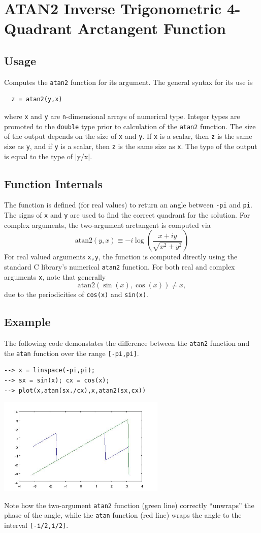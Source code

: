 \section{ATAN2 Inverse Trigonometric 4-Quadrant Arctangent Function}

\subsection{Usage}

Computes the \verb|atan2| function for its argument.  The general
syntax for its use is
\begin{verbatim}
  z = atan2(y,x)
\end{verbatim}
where \verb|x| and \verb|y| are \verb|n|-dimensional arrays of numerical type.
Integer types are promoted to the \verb|double| type prior to
calculation of the \verb|atan2| function. The size of the output depends
on the size of \verb|x| and \verb|y|.  If \verb|x| is a scalar, then \verb|z|
is the same size as \verb|y|, and if \verb|y| is a scalar, then \verb|z|
is the same size as \verb|x|.  The type of the output is equal to the type of
|y/x|.  
\subsection{Function Internals}

The function is defined (for real values) to return an 
angle between \verb|-pi| and \verb|pi|.  The signs of \verb|x| and \verb|y|
are used to find the correct quadrant for the solution.  For complex
arguments, the two-argument arctangent is computed via
\[
  \mathrm{atan2}(y,x) \equiv -i \log\left(\frac{x+i y}{\sqrt{x^2+y^2}} \right)
\]
For real valued arguments \verb|x,y|, the function is computed directly using 
the standard C library's numerical \verb|atan2| function. For both 
real and complex arguments \verb|x|, note that generally
\[
  \mathrm{atan2}(\sin(x),\cos(x)) \neq x,
\]
due to the periodicities of  \verb|cos(x)| and \verb|sin(x)|.
\subsection{Example}

The following code demonstates the difference between the \verb|atan2| 
function and the \verb|atan| function over the range \verb|[-pi,pi]|.
\begin{verbatim}
--> x = linspace(-pi,pi);
--> sx = sin(x); cx = cos(x);
--> plot(x,atan(sx./cx),x,atan2(sx,cx))
\end{verbatim}


\centerline{\includegraphics[width=8cm]{atan2plot}}

Note how the two-argument \verb|atan2| function (green line) 
correctly ``unwraps'' the phase of the angle, while the \verb|atan| 
function (red line) wraps the angle to the interval \verb|[-i/2,i/2]|.
